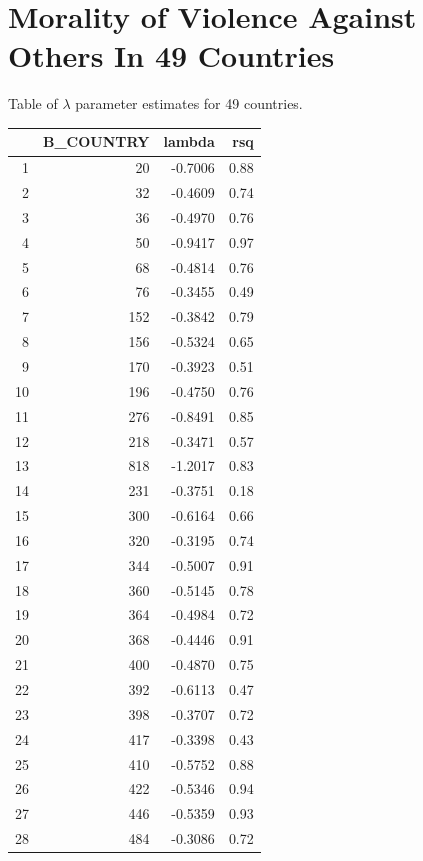 \documentclass{amsart}
\begin{document}
\section{Morality of Violence Against Others In 49 Countries}

Table of $\lambda$ parameter estimates for 49 countries.

\begin{longtable}{rrrr}
  \hline
 & B\_COUNTRY & lambda & rsq \\ 
  \hline
1 & 20 & -0.7006 & 0.88 \\ 
  2 & 32 & -0.4609 & 0.74 \\ 
  3 & 36 & -0.4970 & 0.76 \\ 
  4 & 50 & -0.9417 & 0.97 \\ 
  5 & 68 & -0.4814 & 0.76 \\ 
  6 & 76 & -0.3455 & 0.49 \\ 
  7 & 152 & -0.3842 & 0.79 \\ 
  8 & 156 & -0.5324 & 0.65 \\ 
  9 & 170 & -0.3923 & 0.51 \\ 
  10 & 196 & -0.4750 & 0.76 \\ 
  11 & 276 & -0.8491 & 0.85 \\ 
  12 & 218 & -0.3471 & 0.57 \\ 
  13 & 818 & -1.2017 & 0.83 \\ 
  14 & 231 & -0.3751 & 0.18 \\ 
  15 & 300 & -0.6164 & 0.66 \\ 
  16 & 320 & -0.3195 & 0.74 \\ 
  17 & 344 & -0.5007 & 0.91 \\ 
  18 & 360 & -0.5145 & 0.78 \\ 
  19 & 364 & -0.4984 & 0.72 \\ 
  20 & 368 & -0.4446 & 0.91 \\ 
  21 & 400 & -0.4870 & 0.75 \\ 
  22 & 392 & -0.6113 & 0.47 \\ 
  23 & 398 & -0.3707 & 0.72 \\ 
  24 & 417 & -0.3398 & 0.43 \\ 
  25 & 410 & -0.5752 & 0.88 \\ 
  26 & 422 & -0.5346 & 0.94 \\ 
  27 & 446 & -0.5359 & 0.93 \\ 
  28 & 484 & -0.3086 & 0.72 \\ 

\end{longtable}
\end{document}
